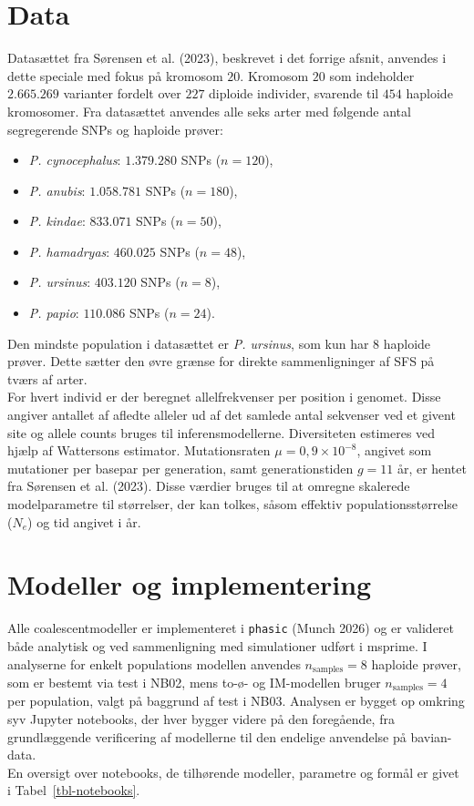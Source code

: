 \documentclass[
  10pt,
  a4paper,
]{scrbook}
\providecommand{\tightlist}{%
  \setlength{\itemsep}{0pt}\setlength{\parskip}{0pt}}
\let\oldemph\emph
\renewcommand\emph[1]{\oldemph{\color{gray}#1}}
\begin{document}
\section{Data}\label{data}

Datasættet fra {Sørensen et al.} (2023), beskrevet i det forrige afsnit,
anvendes i dette speciale med fokus på kromosom \(20\). Kromosom \(20\)
som indeholder \(2.665.269\) varianter fordelt over \(227\) diploide
individer, svarende til \(454\) haploide kromosomer. Fra datasættet
anvendes alle seks arter med følgende antal segregerende SNPs og
haploide prøver:

\begin{itemize}
\tightlist
\item
  \emph{P. cynocephalus}: \(1.379.280\) SNPs (\(n=120\)),
\item
  \emph{P. anubis}: \(1.058.781\) SNPs (\(n=180\)),
\item
  \emph{P. kindae}: \(833.071\) SNPs (\(n=50\)),
\item
  \emph{P. hamadryas}: \(460.025\) SNPs (\(n=48\)),
\item
  \emph{P. ursinus}: \(403.120\) SNPs (\(n=8\)),
\item
  \emph{P. papio}: \(110.086\) SNPs (\(n=24\)).
\end{itemize}

Den mindste population i datasættet er \emph{P. ursinus}, som kun har
\(8\) haploide prøver. Dette sætter den øvre grænse for direkte
sammenligninger af SFS på tværs af arter.\\
For hvert individ er der beregnet allelfrekvenser per position i
genomet. Disse angiver antallet af afledte alleler ud af det samlede
antal sekvenser ved et givent site og allele counts bruges til
inferensmodellerne. Diversiteten estimeres ved hjælp af Wattersons
estimator. Mutationsraten \(\mu = 0{,}9 \times 10^{-8}\), angivet som
mutationer per basepar per generation, samt generationstiden \(g=11\)
år, er hentet fra {Sørensen et al.} (2023). Disse værdier bruges til at
omregne skalerede modelparametre til størrelser, der kan tolkes, såsom
effektiv populationsstørrelse (\(N_e\)) og tid angivet i år.

\section{Modeller og implementering}\label{modeller-og-implementering}

Alle coalescentmodeller er implementeret i \texttt{phasic} (Munch 2026)
og er valideret både analytisk og ved sammenligning med simulationer
udført i msprime. I analyserne for enkelt populations modellen anvendes
\(n_{\text{samples}} = 8\) haploide prøver, som er bestemt via test i
NB02, mens to-ø- og IM-modellen bruger \(n_{\text{samples}} = 4\) per
population, valgt på baggrund af test i NB03. Analysen er bygget op
omkring syv Jupyter notebooks, der hver bygger videre på den foregående,
fra grundlæggende verificering af modellerne til den endelige anvendelse
på bavian-data.\\
En oversigt over notebooks, de tilhørende modeller, parametre og formål
er givet i Tabel~\ref{tbl-notebooks}.
\end{document}
